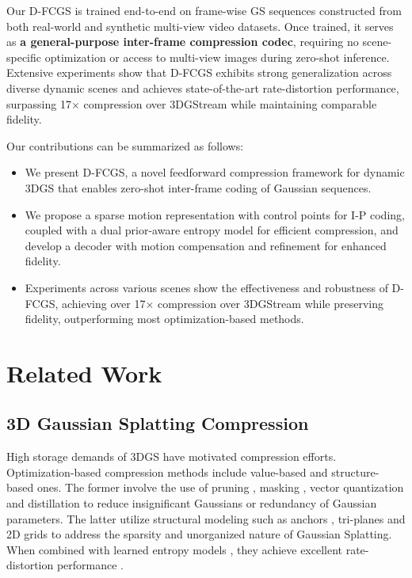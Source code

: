 \documentclass[letterpaper]{article} %
\begin{document}
Our D-FCGS is trained end-to-end on frame-wise GS sequences constructed from both real-world and synthetic multi-view video datasets. Once trained, it serves as \textbf{a general-purpose inter-frame compression codec}, requiring no scene-specific optimization or access to multi-view images during zero-shot inference. Extensive experiments show that D-FCGS exhibits strong generalization across diverse dynamic scenes and achieves state-of-the-art rate-distortion performance, surpassing 17$\times$ compression over 3DGStream while maintaining comparable fidelity.

Our contributions can be summarized as follows: 
\begin{itemize}
\item We present D-FCGS, a novel feedforward compression framework for dynamic 3DGS that enables zero-shot inter-frame coding of Gaussian sequences.
\item We propose a sparse motion representation with control points for I-P coding, coupled with a dual prior-aware entropy model for efficient compression, and develop a decoder with motion compensation and refinement for enhanced fidelity.
\item Experiments across various scenes show the effectiveness and robustness of D-FCGS, achieving over 17$\times$ compression over 3DGStream while preserving fidelity, outperforming most optimization-based methods.
\end{itemize}

\section{Related Work}

\subsection{3D Gaussian Splatting Compression} 

High storage demands of 3DGS have motivated compression efforts. Optimization-based compression methods include value-based and structure-based ones. The former involve the use of pruning \cite{girish2024eagles, ali2024trimming}, masking \cite{lee2024compact, wang2024end}, vector quantization \cite{niedermayr2024compressed, navaneet2023compact3d} and distillation \cite{fan2024lightgaussian} to reduce insignificant Gaussians or redundancy of Gaussian parameters. The latter utilize structural modeling such as anchors \cite{lu2024scaffold}, tri-planes \cite{lee2025compression} and 2D grids \cite{morgenstern2024compact} to address the sparsity and unorganized nature of Gaussian Splatting. When combined with learned entropy models \cite{balle2016end, cheng2020learned}, they achieve excellent rate-distortion performance \cite{chen2024hac, chen2025hac++, zhan2025cat}.
\end{document}
